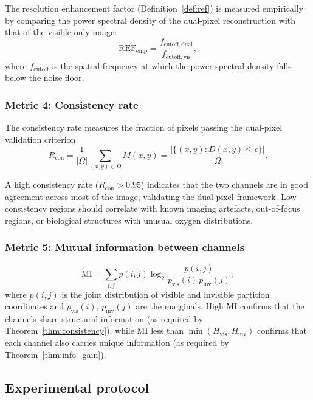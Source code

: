 \documentclass[11pt,twocolumn,a4paper]{article}
\begin{document}
The resolution enhancement factor (Definition~\ref{def:ref}) is measured empirically by comparing the power spectral density of the dual-pixel reconstruction with that of the visible-only image:
\begin{equation}\label{eq:ref_empirical}
\mathrm{REF}_{\mathrm{emp}} = \frac{f_{\mathrm{cutoff,dual}}}{f_{\mathrm{cutoff,vis}}},
\end{equation}
where $f_{\mathrm{cutoff}}$ is the spatial frequency at which the power spectral density falls below the noise floor.

\subsubsection{Metric 4: Consistency rate}

The consistency rate measures the fraction of pixels passing the dual-pixel validation criterion:
\begin{equation}\label{eq:consistency_rate}
R_{\mathrm{con}} = \frac{1}{|\Omega|}\sum_{(x,y) \in \Omega} M(x,y) = \frac{|\{(x,y) : D(x,y) \leq \epsilon\}|}{|\Omega|}.
\end{equation}

A high consistency rate ($R_{\mathrm{con}} > 0.95$) indicates that the two channels are in good agreement across most of the image, validating the dual-pixel framework.
Low consistency regions should correlate with known imaging artefacts, out-of-focus regions, or biological structures with unusual oxygen distributions.

\subsubsection{Metric 5: Mutual information between channels}

\begin{equation}\label{eq:mi}
\mathrm{MI} = \sum_{i,j} p(i,j) \log_2 \frac{p(i,j)}{p_{\mathrm{vis}}(i)\, p_{\mathrm{inv}}(j)},
\end{equation}
where $p(i,j)$ is the joint distribution of visible and invisible partition coordinates and $p_{\mathrm{vis}}(i)$, $p_{\mathrm{inv}}(j)$ are the marginals.
High MI confirms that the channels share structural information (as required by Theorem~\ref{thm:consistency}), while MI less than $\min(H_{\mathrm{vis}}, H_{\mathrm{inv}})$ confirms that each channel also carries unique information (as required by Theorem~\ref{thm:info_gain}).

\subsection{Experimental protocol}
\end{document}
